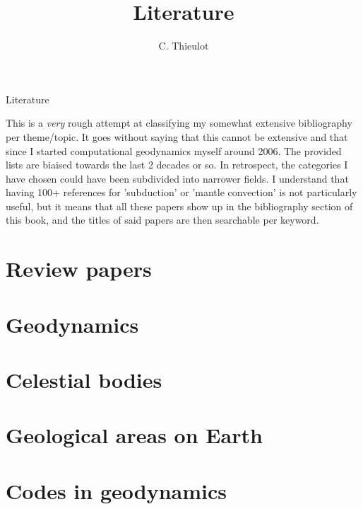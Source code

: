 \documentclass[a4paper,12pt]{report}
\title{Literature}
\author{C. Thieulot}
\begin{document}
\thispagestyle{empty}

\begin{center}
{\large Literature}
\end{center}

\newpage

\tableofcontents

\newpage
This is a {\it very} rough attempt at classifying my somewhat extensive 
bibliography per theme/topic.
It goes without saying that this cannot be extensive and that since I 
started computational geodynamics myself around 2006. 
The provided lists are biaised towards the last 2 decades or so. 
In retrospect, the categories I have chosen could have been subdivided
into narrower fields. I understand that having 100+ references 
for 'subduction'  or 'mantle convection' is not particularly useful, 
but it means that all these papers show up in the bibliography section 
of this book, and the titles of said papers are then searchable per keyword.

\chapter{Review papers} 

\chapter{Geodynamics} 

\chapter{Celestial bodies} 

\chapter{Geological areas on Earth} 


\chapter{Codes in geodynamics } 



\end{document}
